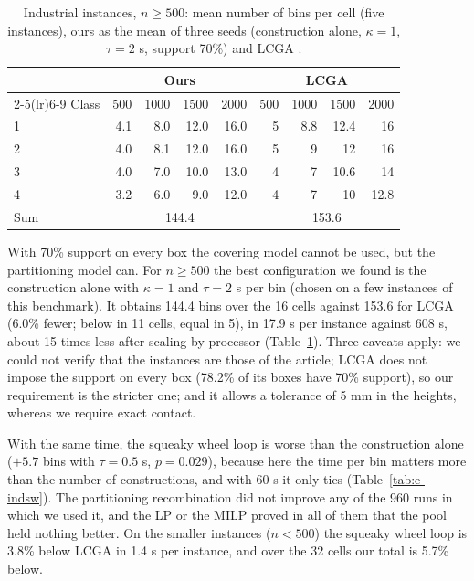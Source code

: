 \begin{table}[t]
\centering
\small\setlength{\tabcolsep}{4pt}
\caption{Industrial instances, $n\ge 500$: mean number of bins per cell (five instances), ours as the mean of three seeds (construction alone, $\kappa=1$,
$\tau=2$ s, support 70\%) and LCGA \citep{Elhedhli2019}.}
\label{tab:e-ind}
\begin{tabular}{@{}lrrrrrrrr@{}}
\toprule
 & \multicolumn{4}{c}{Ours} & \multicolumn{4}{c}{LCGA}\\
\cmidrule(lr){2-5}\cmidrule(lr){6-9}
Class & 500 & 1000 & 1500 & 2000 & 500 & 1000 & 1500 & 2000\\
\midrule
1 & 4.1 & 8.0 & 12.0 & 16.0 & 5 & 8.8 & 12.4 & 16\\
2 & 4.0 & 8.1 & 12.0 & 16.0 & 5 & 9 & 12 & 16\\
3 & 4.0 & 7.0 & 10.0 & 13.0 & 4 & 7 & 10.6 & 14\\
4 & 3.2 & 6.0 & 9.0 & 12.0 & 4 & 7 & 10 & 12.8\\
\midrule
Sum & \multicolumn{4}{c}{144.4} & \multicolumn{4}{c}{153.6}\\
\bottomrule
\end{tabular}
\end{table}

With 70\% support on every box the covering model cannot be used, but the partitioning model can. For $n\ge 500$ the
best configuration we found is the construction alone with $\kappa=1$ and $\tau=2$ s per bin (chosen on a few instances
of this benchmark). It obtains 144.4 bins over the 16 cells against 153.6 for LCGA (6.0\% fewer; below in 11 cells,
equal in 5), in 17.9 s per instance against 608 s, about 15 times less after scaling by processor
(Table~\ref{tab:e-ind}). Three caveats apply: we could not verify that the instances are those of the article; LCGA does
not impose the support on every box (78.2\% of its boxes have 70\% support), so our requirement is the stricter one; and
it allows a tolerance of 5 mm in the heights, whereas we require exact contact.

With the same time, the squeaky wheel loop is worse than the construction alone ($+5.7$ bins with $\tau=0.5$ s,
$p=0.029$), because here the time per bin matters more than the number of constructions, and with 60 s it only ties
(Table~\ref{tab:e-indsw}). The partitioning recombination did not improve any of the 960 runs in which we used it, and
the LP or the MILP proved in all of them that the pool held nothing better. On the smaller instances ($n<500$) the
squeaky wheel loop is 3.8\% below LCGA in 1.4 s per instance, and over the 32 cells our total is 5.7\% below.

